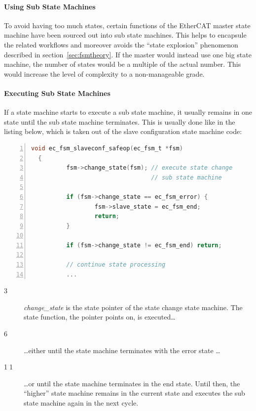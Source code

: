 \documentclass[a4paper,12pt,BCOR6mm,bibtotoc,idxtotoc]{scrbook}
\begin{document}
\paragraph{Using Sub State Machines}

To avoid having too much states, certain functions of the EtherCAT
master state machine have been sourced out into sub state machines.
This helps to encapsule the related workflows and moreover avoids the
``state explosion'' phenomenon described in
section~\ref{sec:fsmtheory}. If the master would instead use one big
state machine, the number of states would be a multiple of the actual
number. This would increase the level of complexity to a
non-manageable grade.

\paragraph{Executing Sub State Machines}

If a state machine starts to execute a sub state machine, it usually
remains in one state until the sub state machine terminates. This is
usually done like in the listing below, which is taken out of the
slave configuration state machine code:

\begin{lstlisting}[language=C,numbers=left]
  void ec_fsm_slaveconf_safeop(ec_fsm_t *fsm)
  {
          fsm->change_state(fsm); // execute state change
                                  // sub state machine

          if (fsm->change_state == ec_fsm_error) {
                  fsm->slave_state = ec_fsm_end;
                  return;
          }

          if (fsm->change_state != ec_fsm_end) return;

          // continue state processing
          ...
\end{lstlisting}

\begin{description}
\item[\normalfont\textcircled{\tiny 3}] \textit{change\_state} is the
  state pointer of the state change state machine. The state function,
  the pointer points on, is executed\ldots
\item[\normalfont\textcircled{\tiny 6}] \ldots either until the state
  machine terminates with the error state \ldots
\item[\normalfont\textcircled{\tiny 11}] \ldots or until the state
  machine terminates in the end state. Until then, the ``higher''
  state machine remains in the current state and executes the sub
  state machine again in the next cycle.
\end{description}
\end{document}
